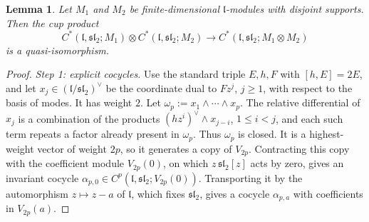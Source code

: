 \documentclass[11pt]{amsart}
\numberwithin{equation}{section}
\newtheorem{lemma}[theorem]{Lemma}
\theoremstyle{definition}
\theoremstyle{remark}
\newcommand{\sltwo}{\mathfrak{sl}_2}
\newcommand{\lie}{\mathfrak{l}}
\begin{document}
\begin{lemma}\label{lem:cup}
Let $M_1$ and $M_2$ be finite-dimensional $\lie$-modules with disjoint supports. Then the cup product
\begin{equation}\label{eq:cup}
C^*(\lie,\sltwo;M_1)\otimes C^*(\lie,\sltwo;M_2)\longrightarrow C^*(\lie,\sltwo;M_1\otimes M_2)
\end{equation}
is a quasi-isomorphism.
\end{lemma}

\begin{proof}
\emph{Step 1: explicit cocycles.} Use the standard triple $E,h,F$ with $[h,E]=2E$, and let $x_j\in(\lie/\sltwo)^\vee$ be the coordinate dual to $Fz^j$, $j\ge1$, with respect to the basis of modes. It has weight $2$. Let $\omega_p:=x_1\wedge\cdots\wedge x_p$. The relative differential of $x_j$ is a combination of the products $(hz^i)^\vee\wedge x_{j-i}$, $1\le i<j$, and each such term repeats a factor already present in $\omega_p$. Thus $\omega_p$ is closed. It is a highest-weight vector of weight $2p$, so it generates a copy of $V_{2p}$. Contracting this copy with the coefficient module $V_{2p}(0)$, on which $z\,\sltwo[z]$ acts by zero, gives an invariant cocycle $\alpha_{p,0}\in C^p(\lie,\sltwo;V_{2p}(0))$. Transporting it by the automorphism $z\mapsto z-a$ of $\lie$, which fixes $\sltwo$, gives a cocycle $\alpha_{p,a}$ with coefficients in $V_{2p}(a)$.


\end{proof}
\end{document}

